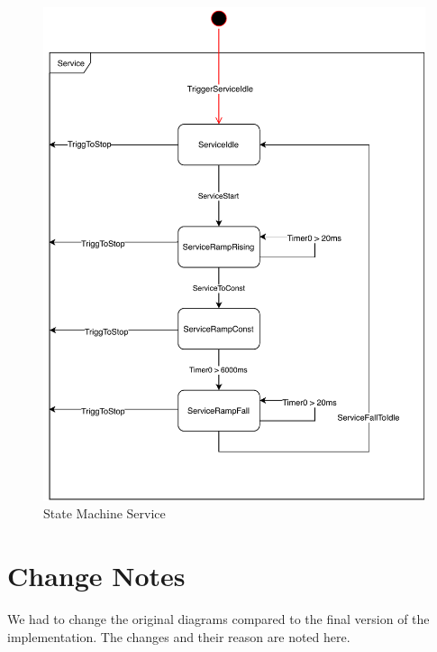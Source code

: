 \documentclass[a4paper,12pt,twoside]{scrreprt}
\begin{document}
\begin{figure}[H]
	\centering
	\includegraphics[width=\textwidth,height=\textheight,keepaspectratio]{stateDiagram/StateMachineService.pdf}
	\caption[State Machine Service]{State Machine Service}
	\label{fig:StateMachineService}
\end{figure}

\chapter{Change Notes}
\label{chap:ChangeNotes}
We had to change the original diagrams compared to the final version of the implementation. The changes and their reason are noted here. 
\end{document}
